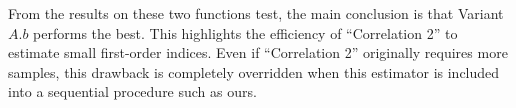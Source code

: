 From the results on these two functions test, the main conclusion is that Variant $A.b$ performs the best. This highlights the efficiency of ``Correlation 2'' to estimate small first-order indices. Even if ``Correlation 2'' originally requires more samples, this drawback is completely overridden when this estimator is included into a sequential procedure such as ours.


